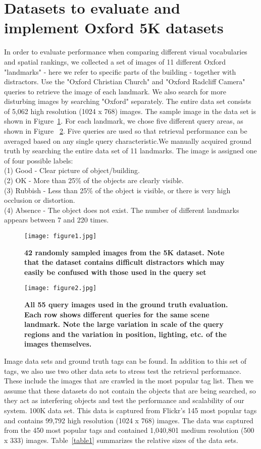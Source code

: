 \documentclass[a4paper,12pt]{article}
\begin{document}
	\section { Datasets to evaluate and implement Oxford 5K datasets}
	In order to evaluate performance when comparing different visual vocabularies and spatial rankings, we collected a set of images of 11 different Oxford "landmarks" - here we refer to specific parts of the building - together with distractors. Use the "Oxford Christian Church" and "Oxford Radcliff Camera" queries to retrieve the image of each landmark. We also search for more disturbing images by searching "Oxford" separately. The entire data set consists of 5,062 high resolution (1024 x 768) images. The sample image in the data set is shown in Figure~\ref{pic1}. For each landmark, we chose five different query areas, as shown in Figure ~\ref{pic2}. Five queries are used so that retrieval performance can be averaged based on any single query characteristic.We manually acquired ground truth by searching the entire data set of 11 landmarks. The image is assigned one of four possible labels:\\
	(1) Good - Clear picture of object/building.\\
	(2) OK - More than 25\% of the objects are clearly visible.\\
	(3) Rubbish - Less than 25\% of the object is visible, or there is very high occlusion or distortion.\\
	(4) Absence - The object does not exist. The number of different landmarks appears between 7 and 220 times.\\
		\begin{figure}[htp]
		\centering
		\texttt{[image: figure1.jpg]}
		\caption{\bfseries{  42 randomly sampled images from the 5K dataset. Note that the dataset contains difﬁcult distractors which may easily be confused with those used in the query set   }}\label{pic1}
	\end{figure}
	\begin{figure}[htp]
	\centering
	\texttt{[image: figure2.jpg]}
	\caption{\bfseries{   All 55 query images used in the ground truth evaluation. Each row shows different queries for the same scene landmark. Note the large variation in scale of the query regions and the variation in position, lighting, etc. of the images themselves.
	  }}\label{pic2}
\end{figure}
	\par Image data sets and ground truth tags can be found.\cite{Philbin2007Object} In addition to this set of tags, we also use two other data sets to stress test the retrieval performance. These include the images that are crawled in the most popular tag list. Then we assume that these datasets do not contain the objects that are being searched, so they act as interfering objects and test the performance and scalability of our system. 100K data set. This data is captured from Flickr's 145 most popular tags and contains 99,792 high resolution (1024 x 768) images. The data was captured from the 450 most popular tags and contained 1,040,801 medium resolution (500 x 333) images. Table~\ref{table1} summarizes the relative sizes of the data sets.
\end{document}
